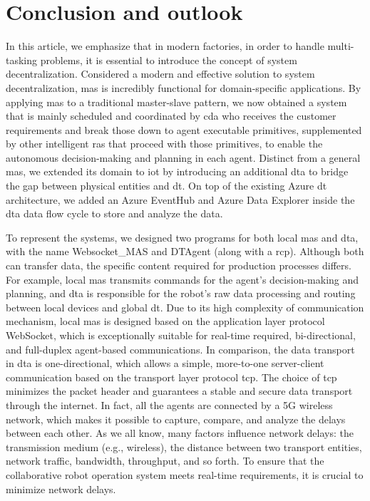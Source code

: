 \chapter{Conclusion and outlook}

In this article, we emphasize that in modern factories, in order to handle 
multi-tasking problems, it is essential to introduce the concept of system 
decentralization. Considered a modern and effective solution to system 
decentralization, \gls{mas} is incredibly functional for domain-specific 
applications. By applying \gls{mas} to a traditional master-slave\cite{egger_deployment-friendly_2020} 
pattern, we now obtained a system that is mainly scheduled and coordinated 
by \gls{cda} who receives the customer requirements and break those down to agent 
executable primitives, supplemented by other intelligent \gls{ras} that proceed 
with those primitives, to enable the 
autonomous decision-making and planning in each agent. Distinct from a 
general \gls{mas}, we extended its domain to \gls{iot} by 
introducing an additional \gls{dta} to bridge the gap between physical 
entities and \gls{dt}. On top of the existing Azure \gls{dt} architecture, we 
added an Azure EventHub and Azure Data Explorer inside the \gls{dta} data 
flow cycle to store and analyze the data. 


To represent the systems, we designed two programs for both local 
\gls{mas} and \gls{dta}, with the name Websocket\_MAS and DTAgent 
(along with a \gls{rcp}). Although both can transfer data, the 
specific content required for production processes differs. For 
example, local \gls{mas} transmits commands for the agent's decision-making 
and planning, and \gls{dta} is responsible for the robot's raw data processing 
and routing between local devices and global \gls{dt}. Due to its high complexity 
of communication mechanism, local \gls{mas} is designed based on the application 
layer protocol WebSocket, which is exceptionally suitable for real-time required, 
bi-directional, and full-duplex agent-based communications. 
In comparison, the data transport in \gls{dta} is one-directional, which allows 
a simple, more-to-one server-client communication based on the transport layer 
protocol \gls{tcp}. The choice of \gls{tcp} minimizes the packet header and 
guarantees a stable and secure data transport through the internet. In fact, 
all the agents are connected by a 5G wireless network, which makes it possible 
to capture, compare, and analyze the delays between each other. As we all know, 
many factors influence network delays: the transmission medium (e.g., wireless), 
the distance between two transport entities, network traffic, bandwidth, 
throughput, and so forth. To ensure that the collaborative robot operation 
system meets real-time requirements, it is crucial to minimize network delays. 



